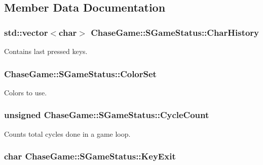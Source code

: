 \subsection{Member Data Documentation}
\hypertarget{struct_chase_game_1_1_s_game_status_a9aa8227d792a823032742d456e43b9a8}{
\subsubsection[{Char\-History}]{\setlength{\rightskip}{0pt plus 5cm}std\-::vector$<$char$>$ Chase\-Game\-::\-S\-Game\-Status\-::\-Char\-History}}\label{struct_chase_game_1_1_s_game_status_a9aa8227d792a823032742d456e43b9a8}


Contains last pressed keys. 

\hypertarget{struct_chase_game_1_1_s_game_status_adc7431634611868499b650c2dc6a67b6}{
\subsubsection[{Color\-Set}]{ Chase\-Game\-::\-S\-Game\-Status\-::\-Color\-Set}}\label{struct_chase_game_1_1_s_game_status_adc7431634611868499b650c2dc6a67b6}


Colors to use. 

\hypertarget{struct_chase_game_1_1_s_game_status_a0a306693a394c28318c8015a975e426d}{
\subsubsection[{Cycle\-Count}]{\setlength{\rightskip}{0pt plus 5cm}unsigned Chase\-Game\-::\-S\-Game\-Status\-::\-Cycle\-Count}}\label{struct_chase_game_1_1_s_game_status_a0a306693a394c28318c8015a975e426d}


Counts total cycles done in a game loop. 

\hypertarget{struct_chase_game_1_1_s_game_status_a6a88e0903d13f10f4fcf8050157b2bdb}{
\subsubsection[{Key\-Exit}]{\setlength{\rightskip}{0pt plus 5cm}char Chase\-Game\-::\-S\-Game\-Status\-::\-Key\-Exit}}\label{struct_chase_game_1_1_s_game_status_a6a88e0903d13f10f4fcf8050157b2bdb}


